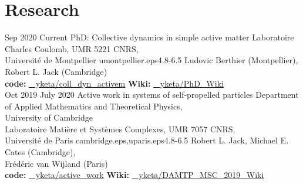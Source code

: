 \documentclass[letterpaper]{cvtemplate_en} %
\begin{document}
\makeprofile %


\vspace{\parskip}
\section{Research}

\begin{cvbody}

\cvitem
	{Sep 2020}
	{Current}
  {PhD: Collective dynamics in simple active matter}
  {Laboratoire Charles Coulomb, UMR 5221 CNRS,\\ Universit\'e de Montpellier }
  {umontpellier.eps}{4.8}{-6.5}
	{Ludovic Berthier (Montpellier),\\ Robert L. Jack (Cambridge)}
  {\\
	{\bf code:} \href{https://github.com/yketa/coll_dyn_activem}{\faGithub~ yketa/coll\_dyn\_activem} \hfill {\bf Wiki:} \href{https://yketa.github.io/PhD_Wiki}{\faGithub~ yketa/PhD\_Wiki}
  }
  \\

\cvitem
	{Oct 2019}
	{July 2020}
  {Active work in systems of self-propelled particles}
  {Department of Applied Mathematics and Theoretical Physics,\\ University of Cambridge \\
	Laboratoire Mati\`ere et Syst\`emes Complexes, UMR 7057 CNRS,\\ Universit\'e de Paris }
  {cambridge.eps,uparis.eps}{4.8}{-6.5}
	{Robert L. Jack, Michael E. Cates (Cambridge),\\ Fr\'ed\'eric van Wijland (Paris)}
  {\\
  {\bf code:} \href{https://github.com/yketa/active_work}{\faGithub~ yketa/active\_work} \hfill {\bf Wiki:} \href{https://yketa.github.io/DAMTP_MSC_2019_Wiki}{\faGithub~ yketa/DAMTP\_MSC\_2019\_Wiki}
  }
  \\


\end{cvbody}
\end{document}
